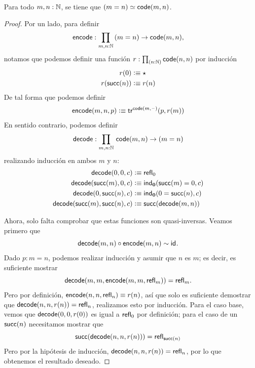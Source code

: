 \documentclass[../main.tex]{subfiles}
\begin{document}
\begin{theorem}
  Para todo $m, n : \mathbb{N}$, se tiene que $(m =n) \simeq \mathsf{code}(m,n)$.
\end{theorem}
\begin{proof}
  Por un lado, para definir
  \[ \encode : \prd{m,n:\N} (m=n) \to \code(m,n), \]
  notamos que podemos definir una funci\'on $r : \prd{n:\N}\code(n,n)$ por inducci\'on
  \begin{align*}
    r(0)       & \vcentcolon\equiv \star \\
    r(\mathsf{succ}(n)) & \vcentcolon\equiv r(n)
  \end{align*}
  De tal forma que podemos definir
  \[ \mathsf{encode}(m,n,p) \vcentcolon\equiv \mathsf{tr}^{\mathsf{code}(m,{\mathord{\hspace{1pt}\text{--}\hspace{1pt}}})}(p,r(m)) \]
  En sentido contrario, podemos definir
  \[ \decode : \prd{m,n:\N} \code(m,n) \to (m=n) \]
  realizando inducci\'on en ambos $m$ y $n$:
  \begin{align*}
    \mathsf{decode}(0,0,c)             & \vcentcolon\equiv \mathsf{refl}_{0}                    \\
    \mathsf{decode}(\mathsf{succ}(m),0,c)       & \vcentcolon\equiv \mathsf{ind}_{\mathbf{0}}(\mathsf{succ}(m)=0,c) \\
    \mathsf{decode}(0,\mathsf{succ}(n),c)       & \vcentcolon\equiv \mathsf{ind}_{\mathbf{0}}(0=\mathsf{succ}(n),c) \\
    \mathsf{decode}(\mathsf{succ}(m),\mathsf{succ}(n),c) & \vcentcolon\equiv \mathsf{succ} (\mathsf{decode}(m,n))
  \end{align*}

  Ahora, solo falta comprobar que estas funciones son quasi-inversas.
  Veamos primero que
  \[ \mathsf{decode}(m,n) \circ \mathsf{encode}(m,n) \sim \mathsf{id}_{}. \]
  Dado $p: m=n$, podemos realizar inducción y asumir que $n$ es $m$; es decir, es suficiente mostrar
  \[\mathsf{decode}(m,m,\mathsf{encode}(m,m,\mathsf{refl}_{m}))=\mathsf{refl}_{m}.\]
  Pero por definici\'on, $\mathsf{encode}(n,n,\mathsf{refl}_{n}) \equiv r(n)$, as\'i que solo es suficiente demostrar que $\mathsf{decode}(n,n,r(n)) =\mathsf{refl}_{n}$, realizamos esto por inducci\'on.
  Para el caso base, vemos que $\mathsf{decode}(0,0,r(0))$ es igual a $\mathsf{refl}_{0}$ por definición; para el caso de un $\mathsf{succ}(n)$ necesitamos mostrar que
  \[ \mathsf{succ}(\mathsf{decode}(n,n,r(n)))= \mathsf{refl}_{\mathsf{succ}(n)} \]
  Pero por la hip\'otesis de inducci\'on, $\mathsf{decode}(n,n,r(n))=\mathsf{refl}_{n}$, por lo que obtenemos el resultado deseado.


\end{proof}
\end{document}
